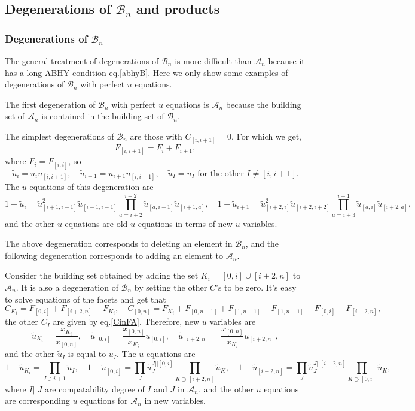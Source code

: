 \documentclass[hidelinks,12pt]{article}
\begin{document}
\subsection{Degenerations of $\mathscr B_n$ and products}
\subsubsection{Degenerations of $\mathscr B_n$}

The general treatment of degenerations of $\mathscr B_n$ is more difficult than $\mathscr A_n$ because it has a long ABHY condition eq.\eqref{abhyB}. Here we only show some examples of degenerations of $\mathscr B_n$ with perfect $u$ equations.

The first degeneration of $\mathscr B_n$ with perfect $u$ equations is $\mathscr A_n$ because the building set of $\mathscr A_n$ is contained in the building set of $\mathscr B_n$.

The simplest degenerations of $\mathscr B_n$ are those with $C_{[i,i+1]}=0$. For which we get,
\[
	F_{[i,i+1]}=F_{i}+F_{i+1},
\]
where $F_i=F_{[i,i]}$, so 
\[
	\tilde u_{i}=u_{i} u_{[i,i+1]},\quad 
	\tilde u_{i+1}=u_{i+1} u_{[i,i+1]},\quad 
	\tilde u_I=u_I \text{ for the other $I\neq [i,i+1]$}.
\]
The $u$ equations of this degeneration are
\[
	1-\tilde u_i=\tilde u_{[i+1,i-1]}^2\tilde u_{[i-1,i-1]}
	\prod_{a=i+2}^{i-2}\tilde u_{[a,i-1]}\tilde u_{[i+1,a]},\quad
	1-\tilde u_{i+1}=
	\tilde u_{[i+2,i]}^2\tilde u_{[i+2,i+2]}\prod_{a=i+3}^{i-1}\tilde u_{[a,i]}\tilde u_{[i+2,a]},
\]
and the other $u$ equations are old $u$ equations in terms of new $u$ variables.

The above degeneration corresponds to deleting an element in $\mathscr B_n$, and the following degeneration corresponds to adding an element to $\mathscr A_n$. 

Consider the building set obtained by adding the set $K_i=[0,i]\cup [i+2,n]$ to $\mathscr A_n$. It is also a degeneration of $\mathscr B_n$ by setting the other $C$'s to be zero. It's easy to solve equations of the facets and get that 
\[
C_{K_i}=F_{[0,i]}+F_{[i+2,n]}-F_{K_i},\quad 
C_{[0,n]}=F_{K_i}+F_{[0,n-1]}+F_{[1,n-1]}-F_{[1,n-1]}-F_{[0,i]}-F_{[i+2,n]},
\]
the other $C_I$ are given by eq.\eqref{CinFA}. Therefore, new $u$ variables are
\[
\tilde u_{K_i}=\frac{x_{K_i}}{x_{[0,n]}},\quad 
\tilde u_{[0,i]}=\frac{x_{[0,n]}}{x_{K_i}}u_{[0,i]},\quad 
\tilde u_{[i+2,n]}=\frac{x_{[0,n]}}{x_{K_i}}u_{[i+2,n]},
\]
and the other $\tilde u_I$ is equal to $u_I$. The $u$ equations are
\[
1-\tilde u_{K_i}=\prod_{I\ni i+1}\tilde u_I,\quad
1-\tilde u_{[0,i]}=\prod_{J}\tilde u_J^{J||[0,i]}\prod_{K\supset [i+2,n]}\tilde u_K,\quad 
1-\tilde u_{[i+2,n]}=\prod_{J}\tilde u_J^{J||[i+2,n]}\prod_{K\supset [0,i]}\tilde u_K, 
\]
where $I||J$ are compatability degree of $I$ and $J$ in $\mathscr A_n$,
and the other $u$ equations are corresponding $u$ equations for $\mathscr A_n$ in new variables. 
\end{document}
